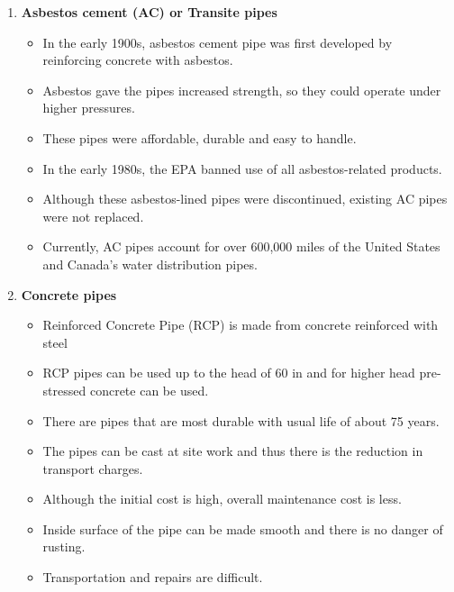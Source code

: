 \begin{itemize}
\begin{enumerate}
\item \textbf{Asbestos cement (AC) or Transite pipes} 
\begin{itemize}
\item In the early 1900s, asbestos cement pipe was first developed by reinforcing concrete with asbestos.
\item Asbestos gave the pipes increased strength, so they could operate under higher pressures. 
\item These pipes were affordable, durable and easy to handle.
\item In the early 1980s, the EPA banned use of all asbestos-related products.
\item Although these asbestos-lined pipes were discontinued, existing AC pipes were not replaced. 
\item Currently, AC pipes account for over 600,000 miles of the United States and Canada’s water distribution pipes.
\end{itemize}

\item \textbf{Concrete pipes} 
\begin{itemize}
\item Reinforced Concrete Pipe (RCP) is made from concrete reinforced with steel
\item RCP pipes can be used up to the head of 60 in and for higher head pre-stressed concrete can be used.
\item There are pipes that are most durable with usual life of about 75 years.
\item The pipes can be cast at site work and thus there is the reduction in transport charges.
\item Although the initial cost is high, overall maintenance cost is less.
\item Inside surface of the pipe can be made smooth and there is no danger of rusting.
\item Transportation and repairs are difficult.
  \end{itemize} 



\end{enumerate}
\end{itemize}
